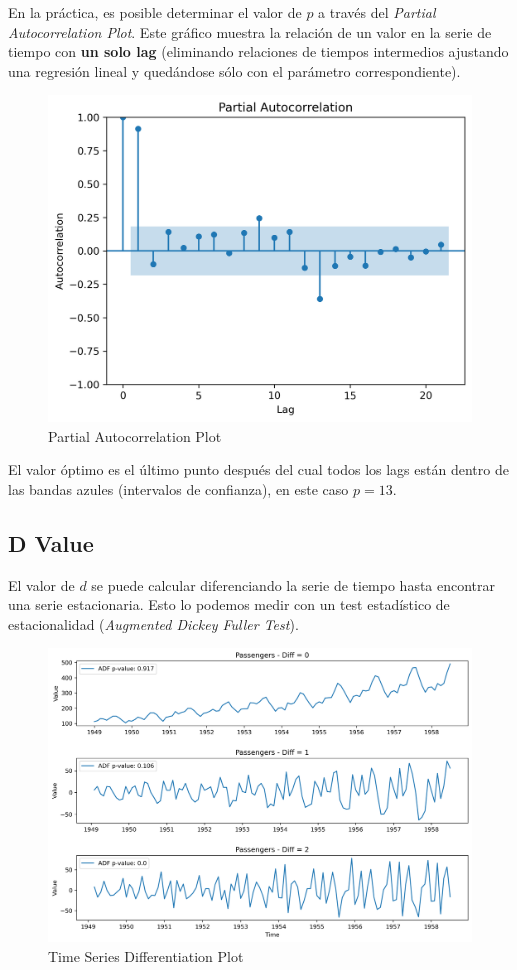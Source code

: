 En la práctica, es posible determinar el valor de $p$ a través del \textit{Partial Autocorrelation Plot}. Este gráfico muestra la relación de un valor en la serie de tiempo con \textbf{un solo lag} (eliminando relaciones de tiempos intermedios ajustando una regresión lineal y quedándose sólo con el parámetro correspondiente).
\begin{figure}[H]
    \center
    \includegraphics[scale=0.5]{notebooks/TS/img/partial_autocorrelation.png}
    \caption{Partial Autocorrelation Plot}
\end{figure}
El valor óptimo es el último punto después del cual todos los lags están dentro de las bandas azules (intervalos de confianza), en este caso $p=13$. 

\subsection{D Value}

El valor de $d$ se puede calcular diferenciando la serie de tiempo hasta encontrar una serie estacionaria. Esto lo podemos medir con un test estadístico de estacionalidad (\textit{Augmented Dickey Fuller Test}).

\begin{figure}[H]
    \center
    \includegraphics[scale=0.5]{notebooks/TS/img/time_series_differentiation.png}
    \caption{Time Series Differentiation Plot}
\end{figure}

